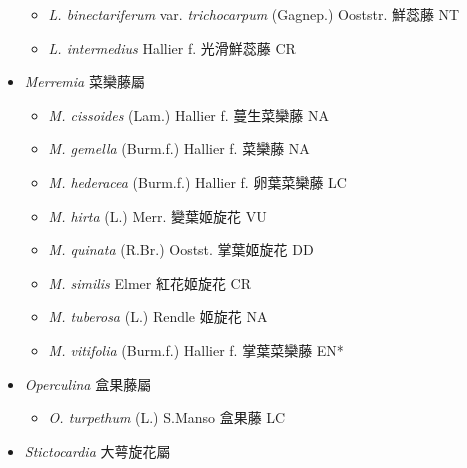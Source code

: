 \begin{itemize}
  \begin{itemize}
        \item[] \textit{L. binectariferum} var. \textit{trichocarpum} (Gagnep.) Ooststr.  鮮蕊藤   NT
        \item[] \textit{L. intermedius} Hallier f.  光滑鮮蕊藤   CR
  \end{itemize}
 \item[] \textit{Merremia} 菜欒藤屬
                                
  \begin{itemize}
        \item[] \textit{M. cissoides} (Lam.) Hallier f.  蔓生菜欒藤   NA
        \item[] \textit{M. gemella} (Burm.f.) Hallier f.  菜欒藤   NA
        \item[] \textit{M. hederacea} (Burm.f.) Hallier f.  卵葉菜欒藤   LC
        \item[] \textit{M. hirta} (L.) Merr.  變葉姬旋花   VU
        \item[] \textit{M. quinata} (R.Br.) Oostst.  掌葉姬旋花   DD
        \item[] \textit{M. similis} Elmer  紅花姬旋花   CR
        \item[] \textit{M. tuberosa} (L.) Rendle  姬旋花   NA
        \item[] \textit{M. vitifolia} (Burm.f.) Hallier f.  掌葉菜欒藤   EN*
  \end{itemize}
 \item[] \textit{Operculina} 盒果藤屬
                                
  \begin{itemize}
        \item[] \textit{O. turpethum} (L.) S.Manso  盒果藤   LC
  \end{itemize}
 \item[] \textit{Stictocardia} 大萼旋花屬
                                

\end{itemize}
